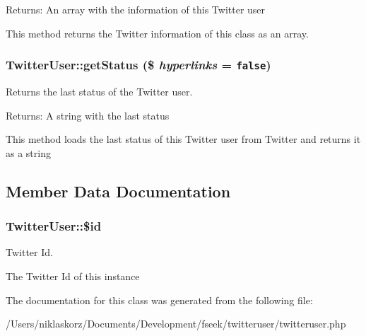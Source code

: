 \begin{Desc}
\item[Returns:]An array with the information of this Twitter user\end{Desc}
This method returns the Twitter information of this class as an array. \hypertarget{class_twitter_user_c9d80058de5952727ecf7f58448d266b}{
\subsubsection[{getStatus}]{\setlength{\rightskip}{0pt plus 5cm}TwitterUser::getStatus (\$ {\em hyperlinks} = {\tt false})}}
\label{class_twitter_user_c9d80058de5952727ecf7f58448d266b}


Returns the last status of the Twitter user. 

\begin{Desc}
\item[Returns:]A string with the last status\end{Desc}
This method loads the last status of this Twitter user from Twitter and returns it as a string 

\subsection{Member Data Documentation}
\hypertarget{class_twitter_user_4096acd6dd8fdc48d8d3523807fb3bef}{
\subsubsection[{\$id}]{\setlength{\rightskip}{0pt plus 5cm}TwitterUser::\$id}}
\label{class_twitter_user_4096acd6dd8fdc48d8d3523807fb3bef}


Twitter Id. 

The Twitter Id of this instance 

The documentation for this class was generated from the following file:\begin{CompactItemize}
\item 
/Users/niklaskorz/Documents/Development/fseek/twitteruser/twitteruser.php\end{CompactItemize}
